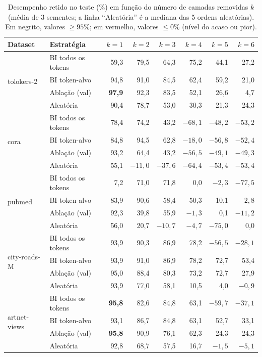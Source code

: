 \documentclass[11pt,a4paper]{article}
\newcommand{\bom}[1]{\textbf{#1}}
\newcommand{\ruim}[1]{\textcolor{red!70!black}{#1}}
\begin{document}
\begin{table}[H]
\centering
\caption{Desempenho retido no teste (\%) em função do número de camadas removidas $k$ (média de 3 sementes; a linha ``Aleatória'' é a mediana das 5 ordens aleatórias). Em negrito, valores $\geq 95\%$; em vermelho, valores $\leq 0\%$ (nível do acaso ou pior).}
\label{tab:curvas}
\small
\begin{tabular}{@{}llrrrrrr@{}}
\toprule
Dataset & Estratégia & $k=1$ & $k=2$ & $k=3$ & $k=4$ & $k=5$ & $k=6$ \\
\midrule
\multirow{4}{*}{tolokers-2}
 & BI todos os tokens & 59,3 & 79,5 & 64,3 & 75,2 & 44,1 & 27,2 \\
 & BI token-alvo      & 94,8 & 91,0 & 84,5 & 62,4 & 59,2 & 21,0 \\
 & Ablação (val)      & \bom{97,9} & 92,3 & 83,5 & 52,1 & 26,6 & 4,7 \\
 & Aleatória          & 90,4 & 78,7 & 53,0 & 30,3 & 21,3 & 24,3 \\
\midrule
\multirow{4}{*}{cora}
 & BI todos os tokens & 78,4 & 74,2 & 43,2 & \ruim{$-68{,}1$} & \ruim{$-48{,}2$} & \ruim{$-53{,}2$} \\
 & BI token-alvo      & 84,8 & 94,5 & 62,8 & \ruim{$-18{,}0$} & \ruim{$-56{,}8$} & \ruim{$-52{,}4$} \\
 & Ablação (val)      & 93,2 & 64,4 & 43,2 & \ruim{$-56{,}5$} & \ruim{$-49{,}1$} & \ruim{$-49{,}3$} \\
 & Aleatória          & 55,1 & \ruim{$-11{,}0$} & \ruim{$-37{,}6$} & \ruim{$-64{,}4$} & \ruim{$-53{,}4$} & \ruim{$-53{,}4$} \\
\midrule
\multirow{4}{*}{pubmed}
 & BI todos os tokens & 7,2 & 71,0 & 71,8 & \ruim{0,0} & \ruim{$-2{,}3$} & \ruim{$-77{,}5$} \\
 & BI token-alvo      & 83,9 & 90,6 & 58,4 & 50,3 & 10,1 & \ruim{$-2{,}8$} \\
 & Ablação (val)      & 92,3 & 39,8 & 55,9 & \ruim{$-1{,}3$} & 0,1 & \ruim{$-11{,}2$} \\
 & Aleatória          & 56,0 & 20,7 & \ruim{$-10{,}7$} & \ruim{$-4{,}7$} & \ruim{$-75{,}0$} & \ruim{0,0} \\
\midrule
\multirow{4}{*}{city-roads-M}
 & BI todos os tokens & 93,9 & 90,3 & 86,9 & 78,2 & \ruim{$-56{,}5$} & \ruim{$-28{,}1$} \\
 & BI token-alvo      & 93,9 & 91,0 & 86,9 & 78,2 & 72,7 & 53,4 \\
 & Ablação (val)      & 95,0 & 88,4 & 80,3 & 73,2 & 72,7 & 27,9 \\
 & Aleatória          & 93,9 & 77,0 & 58,1 & 10,5 & 4,0 & \ruim{$-0{,}9$} \\
\midrule
\multirow{4}{*}{artnet-views}
 & BI todos os tokens & \bom{95,8} & 82,6 & 84,8 & 63,1 & \ruim{$-59{,}7$} & \ruim{$-37{,}1$} \\
 & BI token-alvo      & 93,1 & 86,7 & 84,8 & 63,1 & 52,7 & 33,1 \\
 & Ablação (val)      & \bom{95,8} & 90,9 & 76,1 & 62,3 & 24,3 & 24,3 \\
 & Aleatória          & 92,8 & 68,7 & 57,5 & 16,7 & \ruim{$-1{,}5$} & \ruim{$-5{,}1$} \\
\bottomrule
\end{tabular}
\end{table}
\end{document}
